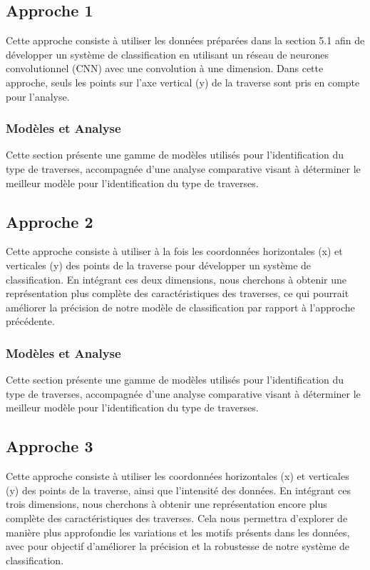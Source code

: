\subsection{Approche 1}

Cette approche consiste à utiliser les données préparées dans la section 5.1  afin de développer un système de classification en utilisant un réseau de neurones convolutionnel (CNN) avec une convolution à une dimension. Dans cette approche, seuls les points sur l'axe vertical (y) de la traverse sont pris en compte pour l'analyse.


\subsubsection{Modèles et Analyse}
Cette section présente une gamme de modèles utilisés pour l'identification du type de traverses, accompagnée d'une analyse comparative visant à déterminer le meilleur modèle pour l'identification du type de traverses. \\

\subsection{Approche 2}
Cette approche consiste à utiliser à la fois les coordonnées horizontales (x) et verticales (y) des points de la traverse pour développer un système de classification. En intégrant ces deux dimensions, nous cherchons à obtenir une représentation plus complète des caractéristiques des traverses, ce qui pourrait améliorer la précision de notre modèle de classification par rapport à l'approche précédente.

\subsubsection{Modèles et Analyse}
Cette section présente une gamme de modèles utilisés pour l'identification du type de traverses, accompagnée d'une analyse comparative visant à déterminer le meilleur modèle pour l'identification du type de traverses. \\

\subsection{Approche 3}
Cette approche  consiste à utiliser les coordonnées horizontales (x) et verticales (y) des points de la traverse, ainsi que l'intensité des données. En intégrant ces trois dimensions, nous cherchons à obtenir une représentation encore plus complète des caractéristiques des traverses. Cela nous permettra d'explorer de manière plus approfondie les variations et les motifs présents dans les données, avec pour objectif d'améliorer la précision et la robustesse de notre système de classification.
